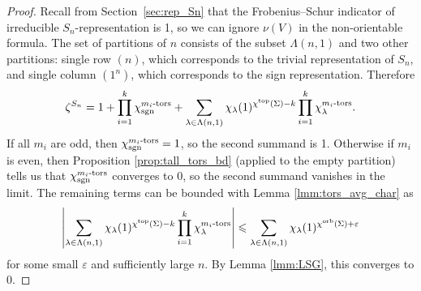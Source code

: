 \documentclass{amsart}
\newcommand{\cho}{\chi^{\textnormal{orb}}}
\newcommand{\tn}{\textnormal}
\begin{document}
\begin{proof}
Recall from Section~\ref{sec:rep_Sn} that the Frobenius--Schur indicator of irreducible $S_n$-representation is 1, so we can ignore $\nu(V)$ in the non-orientable formula. The set of partitions of $n$ consists of the subset $\Lambda(n,1)$ and two other partitions: single row $(n)$, which corresponds to the trivial representation of $S_n$, and single column $(1^n)$, which corresponds to the sign representation. Therefore
\begin{equation*}
\zeta^{S_n}=1+\prod_{i=1}^k\chi_\tn{sgn}^{m_i\tn{-tors}}+\sum_{\lambda\in\Lambda(n,1)}\chi_\lambda(1)^{\chi^\tn{top}(\Sigma)-k}\prod_{i=1}^k\chi_\lambda^{m_i\tn{-tors}}.
\end{equation*}
If all $m_i$ are odd, then $\chi_\tn{sgn}^{m_i\tn{-tors}}=1$, so the second summand is 1. Otherwise if $m_i$ is even, then Proposition \ref{prop:tall_tors_bd} (applied to the empty partition) tells us that $\chi_\tn{sgn}^{m_i\tn{-tors}}$ converges to 0, so the second summand vanishes in the limit. The remaining terms can be bounded with Lemma \ref{lmm:tors_avg_char} as
\begin{equation*}
\left|\sum_{\lambda\in\Lambda(n,1)}\chi_\lambda(1)^{\chi^\tn{top}(\Sigma)-k}\prod_{i=1}^k\chi_\lambda^{m_i\tn{-tors}}\right|\leqslant\sum_{\lambda\in\Lambda(n,1)}\chi_\lambda(1)^{\cho(\Sigma)+\varepsilon}
\end{equation*}
for some small $\varepsilon$ and sufficiently large $n$. By Lemma \ref{lmm:LSG}, this converges to 0.
\end{proof}

\smallskip
\end{document}
